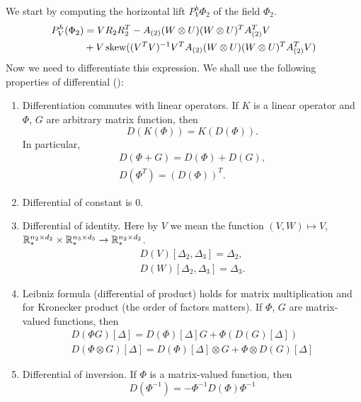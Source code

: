 We start by computing the horizontal lift $P^h_V\Phi_2$ of the field $\Phi_2$.
\begin{equation}
\begin{split}
 P^h_V( \Phi_2 ) & = V R_2 R_2^T - A_{(2)} (W \otimes U) (W \otimes U)^T A_{(2)}^T V \\
&  + V \operatorname*{skew}( (V^T V)^{-1} V^T A_{(2)} (W \otimes U)(W \otimes U)^T A_{(2)}^T V )
\end{split}
\end{equation}
Now we need to differentiate this expression. We shall use the following properties
of differential (\cite{matrix_cookbook}):
\begin{enumerate}
    \item Differentiation commutes with linear operators. If $K$ is a linear operator and $\Phi$, $G$ are
    arbitrary matrix function, then 
    \begin{equation}
    D(K(\Phi)) = K(D(\Phi)).
    \end{equation}
        In particular, 
        \begin{eqnarray}
        D(\Phi+G) = D(\Phi) + D(G),\\ 
        D(\Phi^T) = (D(\Phi))^T.
        \end{eqnarray}
    \item Differential of constant is $0$.
    \item Differential of identity. Here by $V$ we mean the function
        $ (V, W) \mapsto V$,
        $\mathbb{R}^{n_2 \times d_2}_{*}  \times \mathbb{R}^{n_3 \times d_3}_{*} \to \mathbb{R}^{n_2 \times d_2}_{*}$.
        \begin{eqnarray}
        D(V)[\Delta_2, \Delta_3] = \Delta_2, \\
        D(W)[\Delta_2, \Delta_3] = \Delta_3.
        \end{eqnarray}
    \item Leibniz formula (differential of product) holds for matrix multiplication
        and for Kronecker product (the order of factors matters). If $\Phi$, $G$ are matrix-valued
        functions, then
        \begin{eqnarray}
        D(\Phi G)[\Delta] = D(\Phi)[\Delta] G + \Phi (D(G)[\Delta]) \\
        D(\Phi \otimes G)[\Delta] = D(\Phi)[\Delta] \otimes G + \Phi \otimes D(G)[\Delta]
        \end{eqnarray}
        \item Differential of inversion. If $\Phi$ is a matrix-valued function, then
        \begin{equation}
        D(\Phi^{-1}) = - \Phi^{-1} D(\Phi) \Phi^{-1}
        \end{equation}
\end{enumerate}

